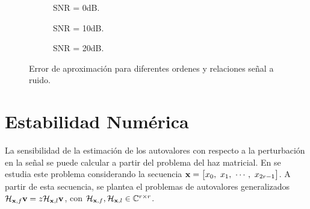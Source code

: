 		\begin{figure}[h!]
			\centering
			\begin{subfigure}[b]{0.3\textwidth} 
				\resizebox{\linewidth}{!}{}
				\caption{SNR = 0dB.}
				\label{fig:comparacion_algoritmo_snr0}
			\end{subfigure}
			\begin{subfigure}[b]{0.3\textwidth}
				\resizebox{\linewidth}{!}{}
				\caption{SNR = 10dB.}
				\label{fig:comparacion_algoritmo_snr10}
			\end{subfigure}
			\begin{subfigure}[b]{0.3\textwidth} 
				\resizebox{\linewidth}{!}{}
				\caption{SNR = 20dB.}
				\label{fig:comparacion_algoritmo_snr20}
			\end{subfigure}
			\caption{Error de aproximación para diferentes ordenes y relaciones señal a ruido.}
			\label{Fig:comparacion_algoritmo}
		\end{figure}
		
		
		
		
	
			
	\section{Estabilidad Numérica}\label{sec:EstNum1}
	
		La sensibilidad de la estimación de los autovalores con respecto a la perturbación en la señal se puede calcular a partir del problema del haz matricial. En \cite{Golub1999, Beckermann2007} se estudia este problema considerando la secuencia $\x = \big[x_0,\ x_1,\ \cdots,\ x_{2r-1} \big]$. A partir de esta secuencia, se plantea el problemas de autovalores generalizados $\mathcal{H}_{\mathbf{x},f}\mathbf{v} = z\mathcal{H}_{\mathbf{x},l}\mathbf{v}$, con $\mathcal{H}_{\mathbf{x},f},\mathcal{H}_{\mathbf{x},l}\in\mathbb{C}^{r\times r}$.
		
